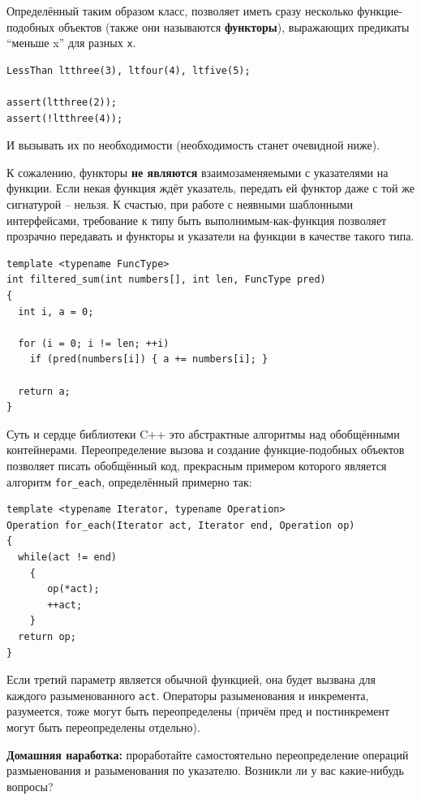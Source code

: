 \documentclass[a4paper,12pt,oneside]{article}
\begin{document}
Определённый таким образом класс, позволяет иметь сразу несколько функцие-подобных объектов (также они называются \textbf{функторы}), выражающих предикаты ``меньше x'' для разных \lstinline!x!.

\begin{lstlisting}
LessThan ltthree(3), ltfour(4), ltfive(5);

assert(ltthree(2));
assert(!ltthree(4));
\end{lstlisting}

И вызывать их по необходимости (необходимость станет очевидной ниже).

К сожалению, функторы \textbf{не являются} взаимозаменяемыми с указателями на функции. Если некая функция ждёт указатель, передать ей функтор даже с той же сигнатурой -- нельзя. К счастью, при работе с неявными шаблонными интерфейсами, требование к типу быть выполнимым-как-функция позволяет прозрачно передавать и функторы и указатели на функции в качестве такого типа.
 
\begin{lstlisting}
template <typename FuncType>
int filtered_sum(int numbers[], int len, FuncType pred)
{
  int i, a = 0;

  for (i = 0; i != len; ++i)
    if (pred(numbers[i]) { a += numbers[i]; }

  return a;
}
\end{lstlisting}

Суть и сердце библиотеки C++ это абстрактные алгоритмы над обобщёнными контейнерами. Переопределение вызова и создание функцие-подобных объектов позволяет писать обобщённый код, прекрасным примером которого является алгоритм \lstinline!for_each!, определённый примерно так:

\begin{lstlisting}
template <typename Iterator, typename Operation>
Operation for_each(Iterator act, Iterator end, Operation op)
{
  while(act != end)
    {
       op(*act);
       ++act;
    }
  return op;
}
\end{lstlisting}

Если третий параметр является обычной функцией, она будет вызвана для каждого разыменованного \lstinline!act!. Операторы разыменования и инкремента, разумеется, тоже могут быть переопределены (причём пред и постинкремент могут быть переопределены отдельно).

\textbf{Домашняя наработка:} проработайте самостоятельно переопределение операций размыенования и разыменования по указателю. Возникли ли у вас какие-нибудь вопросы?
\end{document}

